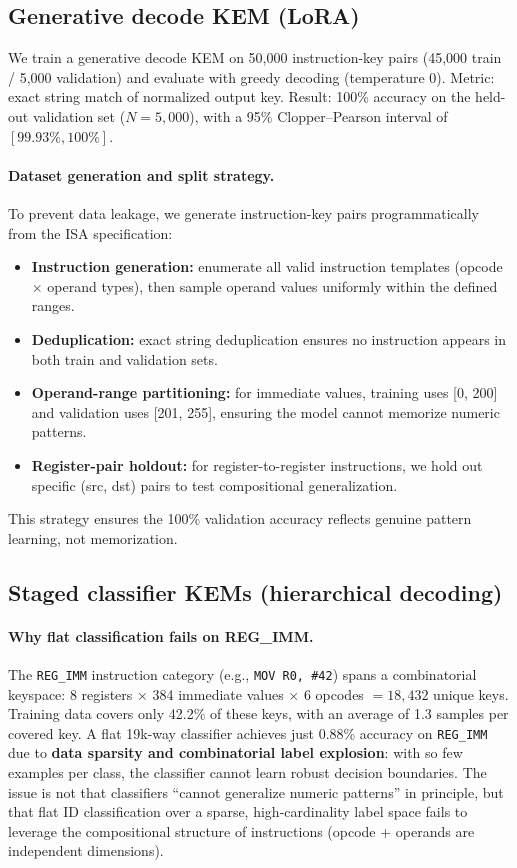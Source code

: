 \documentclass[11pt]{article}
\begin{document}
\subsection{Generative decode KEM (LoRA)}
We train a generative decode KEM on 50{,}000 instruction-key pairs (45{,}000 train / 5{,}000 validation) and evaluate with greedy decoding (temperature 0).
Metric: exact string match of normalized output key.
Result: 100\% accuracy on the held-out validation set ($N=5{,}000$), with a 95\% Clopper–Pearson interval of $[99.93\%, 100\%]$.

\paragraph{Dataset generation and split strategy.}
To prevent data leakage, we generate instruction-key pairs programmatically from the ISA specification:
\begin{itemize}[leftmargin=*]
  \item \textbf{Instruction generation:} enumerate all valid instruction templates (opcode $\times$ operand types), then sample operand values uniformly within the defined ranges.
  \item \textbf{Deduplication:} exact string deduplication ensures no instruction appears in both train and validation sets.
  \item \textbf{Operand-range partitioning:} for immediate values, training uses [0, 200] and validation uses [201, 255], ensuring the model cannot memorize numeric patterns.
  \item \textbf{Register-pair holdout:} for register-to-register instructions, we hold out specific (src, dst) pairs to test compositional generalization.
\end{itemize}
This strategy ensures the 100\% validation accuracy reflects genuine pattern learning, not memorization.

\subsection{Staged classifier KEMs (hierarchical decoding)}

\paragraph{Why flat classification fails on REG\_IMM.}
The \texttt{REG\_IMM} instruction category (e.g., \texttt{MOV R0, \#42}) spans a combinatorial keyspace: 8 registers $\times$ 384 immediate values $\times$ 6 opcodes $= 18{,}432$ unique keys.
Training data covers only 42.2\% of these keys, with an average of 1.3 samples per covered key.
A flat 19k-way classifier achieves just 0.88\% accuracy on \texttt{REG\_IMM} due to \textbf{data sparsity and combinatorial label explosion}: with so few examples per class, the classifier cannot learn robust decision boundaries.
The issue is not that classifiers ``cannot generalize numeric patterns'' in principle, but that flat ID classification over a sparse, high-cardinality label space fails to leverage the compositional structure of instructions (opcode + operands are independent dimensions).
\end{document}
